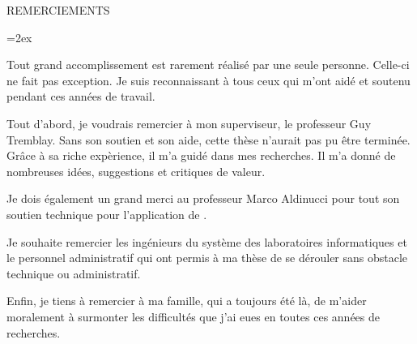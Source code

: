 
   \parskip=0pt
   \vspace*{0.1 truecm} 
   \begin{center}
    {\uppercase { REMERCIEMENTS }}\par
   \end{center}
   \nobreak \vspace*{1.10 truecm}
   \parskip=2ex



Tout grand accomplissement est rarement r\'ealis\'e par une seule personne. Celle-ci ne fait pas exception. Je suis reconnaissant \`a tous ceux qui m'ont aid\'e et soutenu pendant ces ann\'ees de travail.

Tout d'abord, je voudrais remercier \`a mon superviseur, le professeur Guy Tremblay. Sans son soutien et son aide, cette th\`ese n'aurait pas pu \^etre termin\'ee. Gr\^ace \`a sa riche exp\`erience, il m'a guid\'e dans mes recherches. Il m'a donn\'e de nombreuses id\'ees, suggestions et critiques de valeur.

Je dois \'egalement un grand merci au professeur Marco Aldinucci pour tout son soutien technique pour l'application de . 

Je souhaite remercier les ing\'enieurs du syst\`eme des laboratoires informatiques et le personnel administratif  qui ont permis \`a ma th\`ese de se d\'erouler sans obstacle technique ou administratif.

Enfin, je tiens \`a remercier \`a ma famille, qui a toujours \'et\'e l\`a, de m'aider moralement \`a surmonter les difficult\'es que j'ai eues en toutes ces ann\'ees de recherches. 


